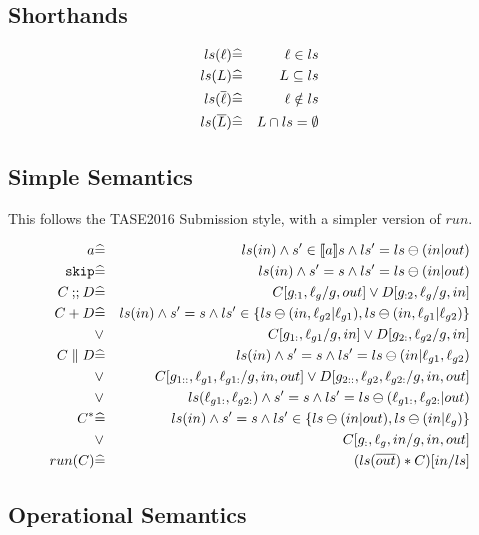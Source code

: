 \subsection{Shorthands}

\begin{eqnarray*}
   ls(\ell) &\widehat=& \ell \in ls
\\ ls(L) &\widehat=& L \subseteq ls
\\ ls(\overline{\ell}) &\widehat=& \ell \notin ls
\\ ls(\overline{L}) &\widehat=& L \cap ls = \emptyset
\end{eqnarray*}

\subsection{Simple Semantics}

This follows the TASE2016 Submission style,
with a simpler version of $run$.

\begin{eqnarray*}
   a
   &\widehat=&
   ls(in) \land s' \in [\![{a}]\!] s \land ls'=ls \ominus (in|out)
\\ \texttt{skip}
   &\widehat=&
   ls(in) \land s' = s \land ls'=ls \ominus (in|out)
\\ C \mathbin{;\!;} D
   &\widehat=&
   C[g_{:1},\ell_g/g,out] \lor D[g_{:2},\ell_g/g,in]
\\ C + D
   &\widehat=&
   ls(in)
   \land s' = s
   \land ls' \in \{ ls \ominus (in,\ell_{g2}|\ell_{g1})
                  , ls \ominus (in,\ell_{g1}|\ell_{g2})\}
\\ &\lor&
   C[g_{1:},\ell_{g1}/g,in] \lor D[g_{2:},\ell_{g2}/g,in]
\\ C \parallel D
   &\widehat=&
   ls(in)
   \land s' = s
   \land ls'= ls \ominus (in|\ell_{g1},\ell_{g2})
\\ &\lor&
   C[g_{1::},\ell_{g1},\ell_{g1:}/g,in,out]
   \lor D[g_{2::},\ell_{g2},\ell_{g2:}/g,in,out]
\\ &\lor&
   ls(\ell_{g1:},\ell_{g2:})
   \land s' = s
   \land ls'= ls \ominus (\ell_{g1:},\ell_{g2:}|out)
\\ C^*
   &\widehat=&
   ls(in)
   \land s' = s
   \land ls' \in \{ ls \ominus (in|out), ls \ominus (in|\ell_g)\}
\\ &\lor&
   C[g_{:},\ell_g,in/g,in,out]
\\ run(C)
   &\widehat=&
   ( ls(\overline{out}) * C)[in/ls]
\end{eqnarray*}

\subsection{Operational Semantics}


